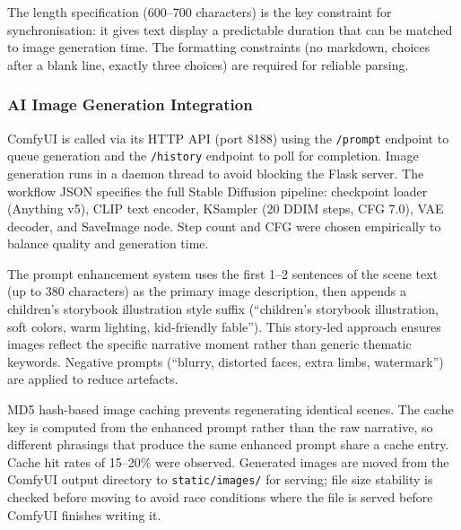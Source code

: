 \documentclass[12pt,a4paper]{article}
\begin{document}
The length specification (600--700 characters) is the key constraint for synchronisation: it gives text display a predictable duration that can be matched to image generation time. The formatting constraints (no markdown, choices after a blank line, exactly three choices) are required for reliable parsing.

    \subsubsection{AI Image Generation Integration}

ComfyUI is called via its HTTP API (port 8188) using the \texttt{/prompt} endpoint to queue generation and the \texttt{/history} endpoint to poll for completion. Image generation runs in a daemon thread to avoid blocking the Flask server. The workflow JSON specifies the full Stable Diffusion pipeline: checkpoint loader (Anything v5), CLIP text encoder, KSampler (20 DDIM steps, CFG 7.0), VAE decoder, and SaveImage node. Step count and CFG were chosen empirically to balance quality and generation time.

The prompt enhancement system uses the first 1--2 sentences of the scene text (up to 380 characters) as the primary image description, then appends a children's storybook illustration style suffix (``children's storybook illustration, soft colors, warm lighting, kid-friendly fable''). This story-led approach ensures images reflect the specific narrative moment rather than generic thematic keywords. Negative prompts (``blurry, distorted faces, extra limbs, watermark'') are applied to reduce artefacts.

MD5 hash-based image caching prevents regenerating identical scenes. The cache key is computed from the enhanced prompt rather than the raw narrative, so different phrasings that produce the same enhanced prompt share a cache entry. Cache hit rates of 15--20\% were observed. Generated images are moved from the ComfyUI output directory to \texttt{static/images/} for serving; file size stability is checked before moving to avoid race conditions where the file is served before ComfyUI finishes writing it.
\end{document}
